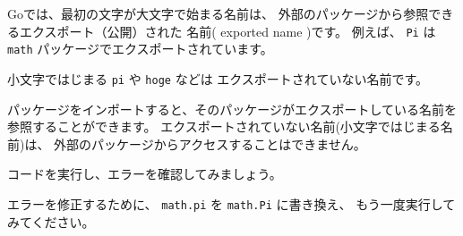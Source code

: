 Goでは、最初の文字が大文字で始まる名前は、
外部のパッケージから参照できるエクスポート（公開）された
名前( exported name )です。 
例えば、 \texttt{Pi} は \texttt{math} パッケージでエクスポートされています。

小文字ではじまる \texttt{pi} や \texttt{hoge} などは
エクスポートされていない名前です。

パッケージをインポートすると、そのパッケージがエクスポートしている名前を
参照することができます。 エクスポートされていない名前(小文字ではじまる名前)は、
外部のパッケージからアクセスすることはできません。

コードを実行し、エラーを確認してみましょう。

エラーを修正するために、 \texttt{math.pi} を \texttt{math.Pi} に書き換え、
もう一度実行してみてください。
